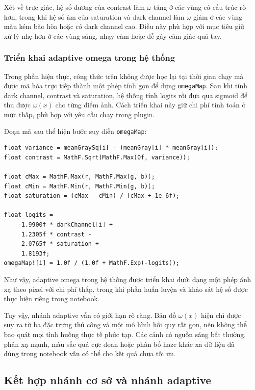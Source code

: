 Xét về trực giác, hệ số dương của contrast làm \(\omega\) tăng ở các vùng có cấu trúc rõ hơn, trong khi hệ số âm của saturation và dark channel làm \(\omega\) giảm ở các vùng màu kém bão hòa hoặc có dark channel cao. Điều này phù hợp với mục tiêu giữ xử lý nhẹ hơn ở các vùng sáng, nhạy cảm hoặc dễ gây cảm giác quá tay.

\subsubsection{Triển khai adaptive omega trong hệ thống}

Trong phần hiện thực, công thức trên không được học lại tại thời gian chạy mà được mã hóa trực tiếp thành một phép tính gọn để dựng \texttt{omegaMap}. Sau khi tính dark channel, contrast và saturation, hệ thống tính logits rồi đưa qua sigmoid để thu được \(\omega(x)\) cho từng điểm ảnh. Cách triển khai này giữ chi phí tính toán ở mức thấp, phù hợp với yêu cầu chạy trong plugin.

Đoạn mã sau thể hiện bước suy diễn \texttt{omegaMap}:

\begin{lstlisting}[style=csharpblock,caption={Trích đoạn suy diễn adaptive omega trong plugin}]
float variance = meanGraySq[i] - (meanGray[i] * meanGray[i]);
float contrast = MathF.Sqrt(MathF.Max(0f, variance));

float cMax = MathF.Max(r, MathF.Max(g, b));
float cMin = MathF.Min(r, MathF.Min(g, b));
float saturation = (cMax - cMin) / (cMax + 1e-6f);

float logits =
    -1.9900f * darkChannel[i] +
     1.2305f * contrast -
     2.0765f * saturation +
     1.8193f;
omegaMap![i] = 1.0f / (1.0f + MathF.Exp(-logits));
\end{lstlisting}

Như vậy, adaptive omega trong hệ thống được triển khai dưới dạng một phép ánh xạ theo pixel với chi phí thấp, trong khi phần huấn luyện và khảo sát hệ số được thực hiện riêng trong notebook.

Tuy vậy, nhánh adaptive vẫn có giới hạn rõ ràng. Bản đồ \(\omega(x)\) hiện chỉ được suy ra từ ba đặc trưng thủ công và một mô hình hồi quy rất gọn, nên không thể bao quát mọi tình huống thực tế phức tạp. Các cảnh có nguồn sáng bất thường, phản xạ mạnh, màu sắc quá cực đoan hoặc phân bố haze khác xa dữ liệu đã dùng trong notebook vẫn có thể cho kết quả chưa tối ưu.

\subsection{Kết hợp nhánh cơ sở và nhánh adaptive}

